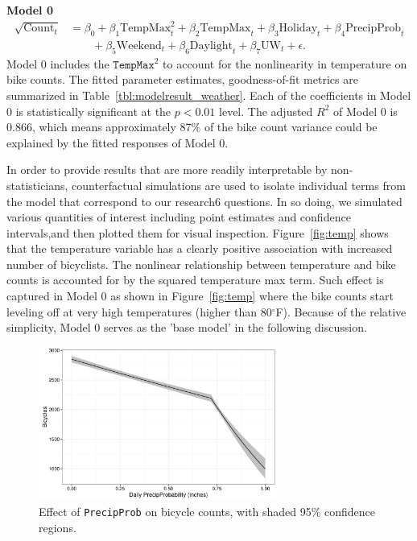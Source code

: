 \documentclass [11pt, proquest] {uwthesis}[2015/03/03]
\begin{document}
\textbf{Model 0}
\begin{align}
\sqrt{\text{Count}_t} &= \beta_0 + \beta_1 \text{TempMax}^2_t + \beta_2 \text{TempMax}_t + \beta_3 \text{Holiday}_t + \beta_4 \text{PrecipProb}_t  \nonumber\\
&\qquad + \beta_5 \text{Weekend}_t + \beta_6 \text{Daylight}_t + \beta_7 \text{UW}_t + \epsilon.\label{eqref:model0}
\end{align}
Model 0 includes the $\texttt{TempMax}^2$ to account for the nonlinearity in temperature on bike counts. The fitted parameter estimates, goodness-of-fit metrics are summarized in Table~\ref{tbl:modelresult_weather}. Each of the coefficients in Model 0 is statistically significant at the $p<0.01$ level. The adjusted $R^2$ of Model 0 is 0.866, which means approximately 87\% of the bike count variance could be explained by the fitted responses of Model 0. 

In order to provide results that are more readily interpretable by non-statisticians, counterfactual simulations are used to isolate individual terms from the model that correspond to our research6 questions. In so doing, we simulated various quantities of interest including point estimates and  confidence intervals,and then plotted them for visual inspection. Figure~\ref{fig:temp} shows that the temperature variable has a clearly positive association with increased number of bicyclists. The nonlinear relationship between temperature and bike counts is accounted for by the squared temperature max term. Such effect is captured in Model 0 as shown in Figure~\ref{fig:temp} where the bike counts start leveling off at very high temperatures (higher than 80$^\circ$F). Because of the relative simplicity, Model 0 serves as the 'base model' in the following discussion. 

\begin{figure}
\centering
   \includegraphics[width=0.7\textwidth]{figures/sim/precip} 
  \caption{Effect of \texttt{PrecipProb} on bicycle counts, with shaded 95\% confidence regions.}
  \label{fig:precip}
\end{figure}
\end{document}
